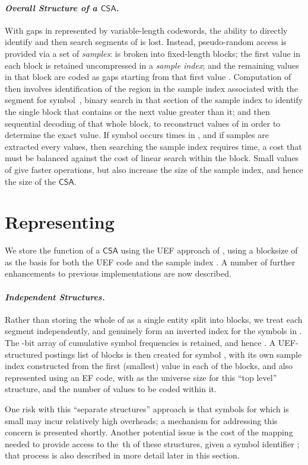 \documentclass{llncs}
\newcommand{\myparagraph}[1]{\paragraph*{\normalsize\it#1.}}
\newcommand{\CSA}[0]{\ensuremath{\mathsf{CSA}}}
\begin{document}
\myparagraph{Overall Structure of a {\CSA}}

With gaps in  represented by variable-length codewords,
the ability to directly identify and then search segments
of  is lost.
Instead, pseudo-random access is provided via a set of
{\emph{samples}}:  is broken into fixed-length blocks; the
first  value in each block is retained uncompressed in a
{\emph{sample index}}; and the remaining values in that block are
coded as gaps starting from that first value
{\citep{os07alenex,s-jalg03}}.
Computation of  then involves identification of
the region in the sample index associated with the segment for
symbol~, binary search in that section of the sample index to
identify the single block that contains  or the next
 value greater than it; and then sequential decoding of that
whole block, to reconstruct values of  in order to determine
the exact value.
If symbol  occurs  times in , and if samples are
extracted every  values, then searching the sample index requires
 time, a cost that must be balanced against the
 cost of linear search within the block.
Small values of  give faster  operations, but
also increase the size of the sample index, and hence the size of the
{\CSA}.


\section{Representing }
\label{sec-newcsa}


We store the  function of a {\CSA} using the UEF approach of
{\citeauthor{ov14sigir}}, using a blocksize of  as the basis for
both the UEF code and the sample index {\citep{gnp-jda15}}.
A number of further enhancements to previous implementations are now
described.

\myparagraph{Independent Structures}

Rather than storing the whole of  as a single entity split into
blocks, we treat each segment independently, and genuinely form an
inverted index for the symbols  in .
The -bit array  of cumulative symbol frequencies is
retained, and hence .
A UEF-structured postings list of  blocks is then
created for symbol , with its own sample index constructed from
the first (smallest) value in each of the blocks, and also
represented using an EF code, with  as the
universe size for this ``top level'' structure, and  the number of values to be coded within it.

One risk with this ``separate structures'' approach is that symbols
 for which  is small may incur relatively high overheads; a
mechanism for addressing this concern is presented shortly.
Another potential issue is the cost of the mapping needed to provide
access to the \,th of these structures, given a symbol identifier
; that process is also described in more detail later in this
section.
\end{document}
